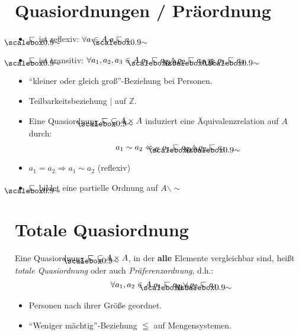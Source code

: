 \documentclass{article}
\begin{document}
\section*{Quasiordnungen / Präordnung}
\begin{defBox}[5.2]
	\begin{itemize}[label=]
		\item $\sqsubsetsim$ ist reflexiv: {\color{colCornYellow} $\forall a \in A. a \sqsubsetsim a$}
		\item $\sqsubsetsim$ ist transitiv: {\color{colCornYellow} $\forall a_1, a_2, a_3 \in A. a_1 \sqsubsetsim a_2 \land a_2 \sqsubsetsim a_3 \Rightarrow a_1 \sqsubsetsim a_3$}
	\end{itemize}
\end{defBox}
\begin{exampleBox}
	\begin{itemize}[label=]
		\item ``kleiner oder gleich groß''-Beziehung bei Personen.
		\item Teilbarkeitsbeziehung $|$ auf $\mathbb{Z}$.
	\end{itemize}
\end{exampleBox}
\begin{noteBox}
	\begin{itemize}[label=]
		\item Eine Quasiordnung $\sqsubsetsim\ \subseteq A \times A$ induziert eine Äquivalenzrelation auf $A$ durch:
		      \[
			      a_1 \sim a_2 \Leftrightarrow_{df} a_1 \sqsubsetsim a_2 \land a_2 \sqsubsetsim a_1
		      \]
		\item $a_1 = a_2 \Rightarrow a_1 \sim a_2$ (reflexiv)
		\item $\sqsubsetsim$ bildet eine partielle Ordnung auf $A \backslash \sim$
	\end{itemize}
\end{noteBox}

\section*{Totale Quasiordnung}
\begin{defBox}
	Eine Quasiordnung $\sqsubsetsim\ \subseteq A \times A$,
	in der \textbf{alle} Elemente vergleichbar sind,
	heißt \textit{totale Quasiordnung} oder auch \textit{Präferenzordnung}, d.h.:
	\[
		\forall a_1, a_2 \in A. a_1 \sqsubsetsim a_2 \lor a_2 \sqsubsetsim a_1
	\]
\end{defBox}
\begin{exampleBox}
	\begin{itemize}[label=]
		\item Personen nach ihrer Größe geordnet.
		\item ``Weniger mächtig''-Beziehung $\leqq$ auf Mengensystemen.
	\end{itemize}
\end{exampleBox}
\end{document}
